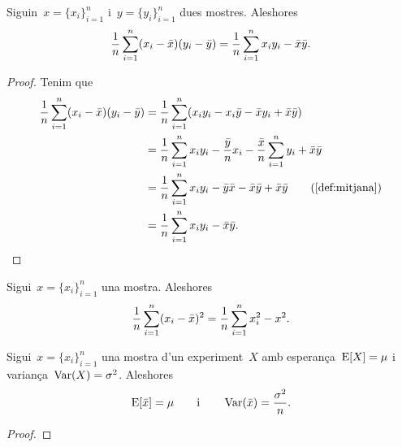 \documentclass[../Apunts.tex]{subfiles}
\begin{document}
\begin{proposition}
	Siguin~\(x=\{x_{i}\}_{i=1}^{n}\) i~\(y=\{y_{i}\}_{i=1}^{n}\) dues mostres.
	Aleshores
	\begin{equation*}
		\frac{1}{n}\sum_{i=1}^{n}(x_{i}-\bar{x})(y_{i}-\bar{y})=\frac{1}{n}\sum_{i=1}^{n}x_{i}y_{i}-\bar{x}\bar{y}.
	\end{equation*}
\end{proposition}
\begin{proof}
	Tenim que
	\begin{align*}
		\frac{1}{n}\sum_{i=1}^{n}(x_{i}-\mitjana{x})(y_{i}-\mitjana{y}) &= \frac{1}{n}\sum_{i=1}^{n}(x_{i}y_{i}-x_{i}\mitjana{y}-\mitjana{x}y_{i}+\mitjana{x}\mitjana{y}) \\
		&= \frac{1}{n}\sum_{i=1}^{n}x_{i}y_{i}-\frac{\mitjana{y}}{n}x_{i}-\frac{\mitjana{x}}{n}\sum_{i=1}^{n}y_{i}+\mitjana{x}\mitjana{y} \\
		&= \frac{1}{n}\sum_{i=1}^{n}x_{i}y_{i}-\mitjana{y}\mitjana{x}-\mitjana{x}\mitjana{y}+\mitjana{x}\mitjana{y} \tag{\eqref{def:mitjana}} \\
		&= \frac{1}{n}\sum_{i=1}^{n}x_{i}y_{i}-\mitjana{x}\mitjana{y}. \qedhere
	\end{align*}
\end{proof}
\begin{corollary}
	\label{cor:MSE de la mitjana}
	Sigui~\(x=\{x_{i}\}_{i=1}^{n}\) una mostra. Aleshores
	\begin{equation*}
		\frac{1}{n}\sum_{i=1}^{n}(x_{i}-\bar{x})^{2}=\frac{1}{n}\sum_{i=1}^{n}x_{i}^{2}-x^{2}.
	\end{equation*}
\end{corollary}
\begin{proposition}
	\label{prop:esperança d'una mostra}
	\label{prop:variança d'una mostra}
	Sigui~\(x=\{x_{i}\}_{i=1}^{n}\) una mostra d'un experiment~\(X\) amb esperança~\(\E{X}=\mu\) i variança~\(\Var{X}=\sigma^{2}\).
	Aleshores
	\begin{equation*}
		\E{\mitjana{x}}=\mu
		\qquad\text{i}\qquad
		\Var{\mitjana{x}}=\frac{\sigma^{2}}{n}.
	\end{equation*}
\end{proposition}
\begin{proof}
\end{proof}
\end{document}
